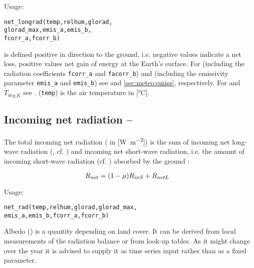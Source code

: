 \noindent
Usage:
\begin{verbatim}
net_longrad(temp,relhum,glorad,
glorad_max,emis_a,emis_b,
fcorr_a,fcorr_b)
\end{verbatim}

\netRadiationLong{} is defined positive in direction to the ground, i.e. negative values indicate a net loss, positive values net gain of energy at the Earth's surface. For \cloudCorrFac{} (including the radiation coefficients \verb!fcorr_a! and \verb!facorr_b!) and \emissivity{} (including the emissivity parameter \verb!emis_a! and \verb!emis_b!) see  and \ref{sec:meteo:emiss}, respectively. For \stefanBoltzmann{} and $T_{deg\_K}$ see . \airtemp{} (\verb!temp!) is the air temperature in [\si{\degreeCelsius}].


\subsection{Incoming net radiation -- \netRadiation} \label{sec:meteo:radnet}
The total incoming net radiation (\netRadiation{} in [\si{\watt\per\metre\squared}]) is the sum of incoming net long-wave radiation (\netRadiationLong{}, cf. ) and incoming net short-wave radiation, i.e. the amount of incoming short-wave radiation \radShortwaveIn{} (cf. ) absorbed by the ground \citep{Maidment1993}:

\begin{equation}\label{eqn:meteo:radnet}
R_{net}{} = (1 - \mu{}) R_{inS}{} + R_{netL}{}
\end{equation}

\noindent
Usage:
\begin{verbatim}
net_rad(temp,relhum,glorad,glorad_max,
emis_a,emis_b,fcorr_a,fcorr_b)
\end{verbatim}

Albedo (\albedo{}) is a quantity depending on land cover. It can be derived from local measurements of the radiation balance or from look-up tables. As it might change over the year it is advised to supply it as time series input rather than as a fixed parameter.


